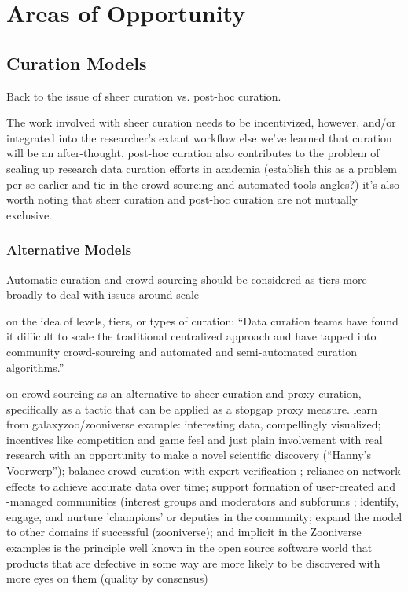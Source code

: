 \documentclass{acm_proc_article-sp}
\begin{document}
\section{Areas of Opportunity}

\subsection{Curation Models}
Back to the issue of sheer curation vs. post-hoc curation.

The work involved with sheer curation needs to be incentivized,
however, and/or integrated into the researcher's extant workflow else
we've learned that curation will be an after-thought. post-hoc
curation also contributes to the problem of scaling
up\cite{curry:community} research data curation efforts in academia
(establish this as a problem per se earlier and tie in the
crowd-sourcing and automated tools angles?) it's also worth noting
that sheer curation and post-hoc curation are not mutually exclusive.

\subsubsection{Alternative Models}
Automatic curation and crowd-sourcing should be considered as tiers more
broadly to deal with issues around scale

on the idea of levels, tiers, or types of curation: ``Data curation
teams have found it difficult to scale the traditional centralized
approach and have tapped into community crowd-sourcing and automated
and semi-automated curation algorithms.''\cite{curry:community}

on crowd-sourcing as an alternative to sheer curation and proxy
curation, specifically as a tactic that can be applied as a stopgap
proxy measure. learn from galaxyzoo/zooniverse example: interesting
data, compellingly visualized; incentives like competition and game
feel and just plain involvement with real research with an opportunity
to make a novel scientific discovery (``Hanny's Voorwerp''); balance
crowd curation with expert verification \cite{adams:galaxyzoo};
reliance on network effects to achieve accurate data over time;
support formation of user-created and -managed communities (interest
groups and moderators and subforums \cite{adams:galaxyzoo}; identify,
engage, and nurture 'champions' or deputies in the community; expand
the model to other domains if successful (zooniverse); and implicit in
the Zooniverse examples is the principle well known in the open source
software world that products that are defective in some way are more
likely to be discovered with more eyes on them (quality by consensus)
\end{document}
